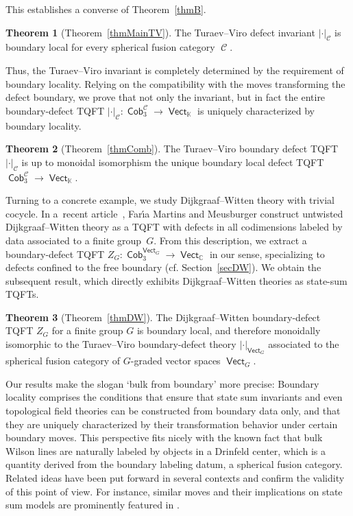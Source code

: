 \documentclass[pdftex]{sigma}
\DeclareMathOperator{\vect}{\mathsf{Vect}}
\DeclareMathOperator{\K}{\mathbb{K}}
\DeclareMathOperator{\C}{\mathbb{C}}
\DeclareMathOperator{\Cob}{\mathsf{Cob}}
\DeclareMathOperator{\calc}{\mathcal{C}}
\numberwithin{equation}{section}
\theoremstyle{definition}
\newtheorem{Mainthm}{Theorem}
\begin{document}
This establishes a converse of Theorem~\ref{thmB}.
\begin{Mainthm}[{Theorem~\ref{thmMainTV}}]
 \label{thmC}
 The Turaev--Viro defect invariant $|\cdot|_{\calc}$ is boundary local for every spherical fusion category $\calc$.
\end{Mainthm}
Thus, the Turaev--Viro invariant is completely determined by the requirement of boundary locality. Relying on the compatibility with the moves transforming the defect boundary, we prove that not only the invariant, but in fact the entire boundary-defect TQFT $|\cdot|_{\calc}\colon \Cob_3^{\calc} \rightarrow \vect_{\K}$ is uniquely characterized by boundary locality.
\begin{Mainthm}[{Theorem~\ref{thmComb}}]
 \label{thmD}
 The Turaev--Viro boundary defect TQFT $|\cdot|_{\calc}$ is up to monoidal isomorphism the unique boundary local defect TQFT $\Cob_3^{\calc} \rightarrow \vect_{\K}$.
\end{Mainthm}

Turning to a concrete example, we study Dijkgraaf--Witten theory with trivial cocycle. In a~recent article~\cite{FMM}, Far\'{\i}a Martins and Meusburger construct untwisted Dijkgraaf--Witten theory as a TQFT with defects in all codimensions labeled by data associated to a finite group~$G$. From this description, we extract a boundary-defect TQFT $Z_G\colon \Cob_3^{\vect_G} \rightarrow \vect_{\C}$ in our sense, specializing to defects confined to the free boundary (cf. Section~\ref{secDW}). We obtain the subsequent result, which directly exhibits Dijkgraaf--Witten theories as state-sum TQFTs.
\begin{Mainthm} [{Theorem~\ref{thmDW}}]
 \label{thmE}
 The Dijkgraaf--Witten boundary-defect TQFT $Z_G$ for a finite group $G$ is boundary local, and therefore monoidally isomorphic to the Turaev--Viro boundary-defect theory $|\cdot|_{\vect_G}$ associated to the spherical fusion category of $G$-graded vector spaces $\vect_G$.
\end{Mainthm}

Our results make the slogan `bulk from boundary' more precise: Boundary locality comprises the conditions that ensure that state sum invariants and even topological field theories can be constructed from boundary data only, and that they are uniquely characterized by their transformation behavior under certain boundary moves. This perspective fits nicely with the known fact that bulk Wilson lines are naturally labeled by objects in a Drinfeld center, which is a quantity derived from the boundary labeling datum, a spherical fusion category. Related ideas have been put forward in several contexts and confirm the validity of this point of view. For instance, similar moves and their implications on state sum models are prominently featured in \cite{CGPT, LMWW, LMWW2, W}.
\end{document}
